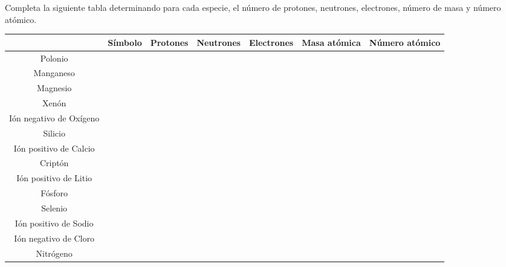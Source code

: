 \question Completa la siguiente tabla determinando para cada especie, el número de protones, neutrones, electrones, número de masa y número atómico.

\begin{tabular}{|c|c|c|c|c|c|c|}
    \hline
                            & Símbolo & Protones & Neutrones & Electrones & Masa atómica & Número atómico \\
    \hline
    Polonio                 &         &          &           &            &              &                \\    \hline
    Manganeso               &         &          &           &            &              &                \\    \hline
    Magnesio                &         &          &           &            &              &                \\    \hline
    Xenón                   &         &          &           &            &              &                \\    \hline
    Ión negativo de Oxígeno &         &          &           &            &              &                \\    \hline
    Silicio                 &         &          &           &            &              &                \\    \hline
    Ión positivo de Calcio  &         &          &           &            &              &                \\    \hline
    Criptón                 &         &          &           &            &              &                \\    \hline
    Ión positivo de Litio   &         &          &           &            &              &                \\    \hline
    Fósforo                 &         &          &           &            &              &                \\    \hline
    Selenio                 &         &          &           &            &              &                \\    \hline
    Ión positivo de Sodio   &         &          &           &            &              &                \\    \hline
    Ión negativo de Cloro   &         &          &           &            &              &                \\    \hline
    Nitrógeno               &         &          &           &            &              &                \\    \hline

\end{tabular}
